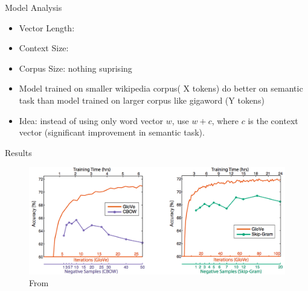 \begin{frame}{Model Analysis}
  \begin{itemize}
  \item Vector Length:
  \item Context Size: 
  \item Corpus Size: nothing suprising
  \item Model trained on smaller wikipedia corpus( X tokens) do better on semantic task than model trained on larger corpus like gigaword (Y tokens)
  \item Idea: instead of using only word vector $w$, use $w+c$, where $c$ is the context vector (significant improvement in semantic task).
  \end{itemize}
\end{frame}

\begin{frame}{Results}
    \begin{figure}
      \includegraphics[scale=0.27]{images/gloveVSword2vec.png}
      \caption{From}
    \end{figure}
\end{frame}

